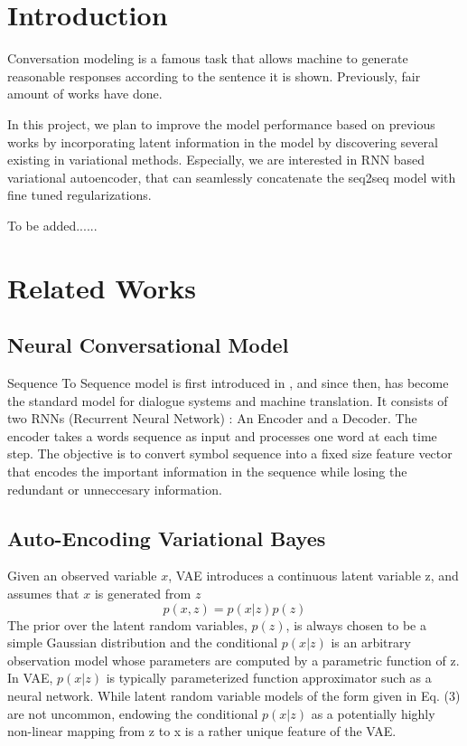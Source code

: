 \documentclass{article}
\begin{document}
\section{Introduction}
Conversation modeling is a famous task that allows machine to generate reasonable responses according to the sentence it is shown. Previously, fair amount of works have done.

In this project, we plan to improve the model performance based on previous works by incorporating latent information in the model by discovering several existing in variational methods. Especially, we are interested in RNN based variational autoencoder, that can seamlessly concatenate the seq2seq model with fine tuned regularizations.

To be added......



\section{Related Works}

\subsection{Neural Conversational Model}

Sequence To Sequence model is first introduced in \cite{seq2seq}, and since then, has become the standard model for dialogue systems and machine translation. It consists of two RNNs (Recurrent Neural Network) : An Encoder and a Decoder. The encoder takes a words sequence as input and processes one word at each time step. The objective is to convert symbol sequence into a fixed size feature vector that encodes the important information in the sequence while losing the redundant or unneccesary information.



\cite{ncm}
\cite{seq2seq}

\subsection{Auto-Encoding Variational Bayes}
\cite{vae}

Given an observed variable $x$, VAE introduces a continuous latent variable z, and assumes that $x$ is generated from $z$
$$p(x,z) = p(x|z)p(z)$$
The prior over the latent random variables, $p(z)$, is always chosen to be a simple Gaussian distribution and the conditional $p(x|z)$ is an arbitrary observation model whose parameters are computed by a parametric function of z. 
In VAE, $p(x|z)$ is typically parameterized function approximator such as a neural network. While latent random variable models of the form given in Eq. (3) are not uncommon, endowing the conditional $p(x|z)$ as a potentially highly non-linear mapping from z to x is a rather unique feature of the VAE.
\end{document}
